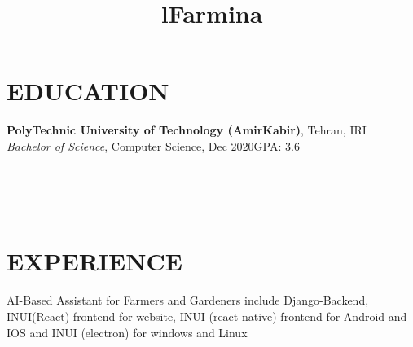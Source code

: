 \documentclass[margin]{res}
\begin{document}

\address{
    \href{https://github.com/MohammadrezaAmani}{GitHub: github.com/MohammadrezaAmani}
    \\\href{https://www.linkedin.com/in/mohammadreza-amani/}{LinkedIn}
    \\\href{https://stackoverflow.com/users/15300704/mohammadreza}{StackOverFlow}}

\address{
    \href{mailto:more.amani@yahoo.com}{Email}
    \\\href{tel:+989905202779}{+98-990-520-2779}\\\href{https://MohammadrezaAmani.github.io}{MohammadrezaAmani.github.io}}

\begin{resume}


\section{EDUCATION}
\textbf{PolyTechnic University of Technology (AmirKabir)}, Tehran, IRI\\
{\sl Bachelor of Science}, Computer Science, Dec 2020\hfill GPA: 3.6




\begin{format}
\title{l}\\
\\
\body\\
\end{format}

\section{EXPERIENCE}
\title{\textbf{Farmina}}
\begin{position}
AI-Based Assistant for Farmers and Gardeners include Django-Backend, INUI(React) frontend for website, INUI (react-native) frontend for Android and IOS and INUI (electron) for windows and Linux 
\end{position}





\end{resume}
\end{document}
